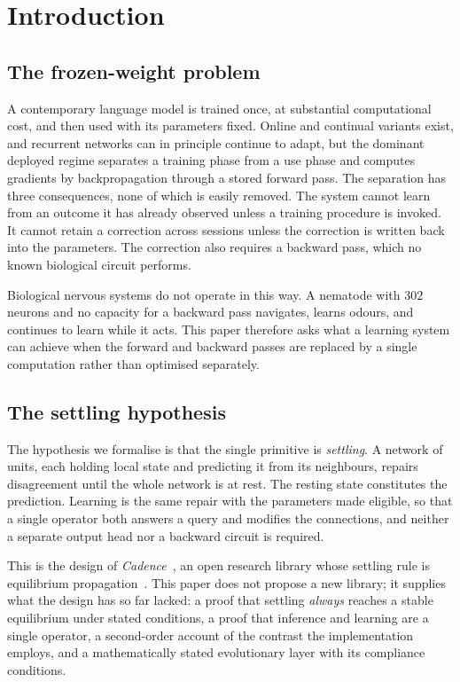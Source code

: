 \documentclass[11pt]{article}
\theoremstyle{definition}
\theoremstyle{remark}
\begin{document}
\tableofcontents

\section{Introduction}

\subsection{The frozen-weight problem}
A contemporary language model is trained once, at substantial computational cost, and then used with its parameters
fixed. Online and continual variants exist, and recurrent networks can in principle continue to adapt, but
the dominant deployed regime separates a training phase from a use phase and computes gradients by
backpropagation through a stored forward pass. The separation has three consequences, none of which is easily removed. The system cannot learn from an outcome it has already observed unless a
training procedure is invoked. It cannot retain a correction across sessions unless the correction is
written back into the parameters. The correction also requires a backward pass, which no known
biological circuit performs.

Biological nervous systems do not operate in this way. A nematode with $302$ neurons and no capacity
for a backward pass navigates, learns odours, and continues to learn while it acts. This paper
therefore asks what a learning system can achieve when the forward and backward passes are replaced
by a single computation rather than optimised separately.

\subsection{The settling hypothesis}
The hypothesis we formalise is that the single primitive is \emph{settling}. A network of units, each
holding local state and predicting it from its neighbours, repairs disagreement until the whole
network is at rest. The resting state constitutes the prediction. Learning is the same repair with the
parameters made eligible, so that a single operator both answers a query and modifies the connections,
and neither a separate output head nor a backward circuit is required.

This is the design of \emph{Cadence}~\cite{cadence,manuscript}, an open research library whose
settling rule is equilibrium propagation~\cite{scellier2017}. This paper does not propose a new
library; it supplies what the design has so far lacked: a proof that settling \emph{always} reaches a
stable equilibrium under stated conditions, a proof that inference and learning are a single operator,
a second-order account of the contrast the implementation employs, and a mathematically stated
evolutionary layer with its compliance conditions.
\end{document}
